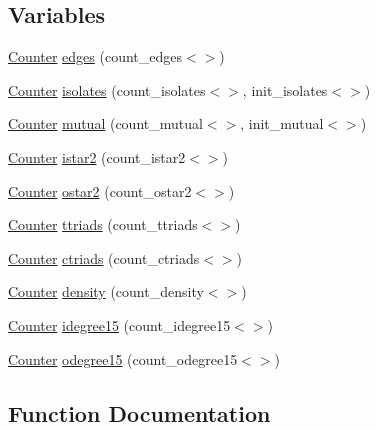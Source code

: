 \subsection*{Variables}
\begin{DoxyCompactItemize}
\item 
\hyperlink{class_counter}{Counter} \hyperlink{namespacecounters_add0b7936c65fe243feeb6172134cc1cc}{edges} (count\+\_\+edges$<$$>$)
\item 
\hyperlink{class_counter}{Counter} \hyperlink{namespacecounters_a3f5dba898b77efbc0fd24dc3e3d3bc9b}{isolates} (count\+\_\+isolates$<$$>$, init\+\_\+isolates$<$$>$)
\item 
\hyperlink{class_counter}{Counter} \hyperlink{namespacecounters_adb7533c3aa1d93d0abd87222bd3ab1ec}{mutual} (count\+\_\+mutual$<$$>$, init\+\_\+mutual$<$$>$)
\item 
\hyperlink{class_counter}{Counter} \hyperlink{namespacecounters_a9c84a53b7160d4633a71636d96c31d47}{istar2} (count\+\_\+istar2$<$$>$)
\item 
\hyperlink{class_counter}{Counter} \hyperlink{namespacecounters_a1a71c3553c8d38fb2e730bcc492eb9ae}{ostar2} (count\+\_\+ostar2$<$$>$)
\item 
\hyperlink{class_counter}{Counter} \hyperlink{namespacecounters_acc969e213447b929fa9f346a71a02fe5}{ttriads} (count\+\_\+ttriads$<$$>$)
\item 
\hyperlink{class_counter}{Counter} \hyperlink{namespacecounters_add58e989152a575a4dd80d50c8c54af6}{ctriads} (count\+\_\+ctriads$<$$>$)
\item 
\hyperlink{class_counter}{Counter} \hyperlink{namespacecounters_ad18705848a3d0689a2078fd261785a47}{density} (count\+\_\+density$<$$>$)
\item 
\hyperlink{class_counter}{Counter} \hyperlink{namespacecounters_ac890cdc7d5d1310e7a7fd1981ce92f1e}{idegree15} (count\+\_\+idegree15$<$$>$)
\item 
\hyperlink{class_counter}{Counter} \hyperlink{namespacecounters_aee8843ddc2e7cc7e2be3a645dfe99dd5}{odegree15} (count\+\_\+odegree15$<$$>$)
\end{DoxyCompactItemize}


\subsection{Function Documentation}
\mbox{\label{namespacecounters_a7e3248247de2a17aac2b02b27f78fa11}} 
